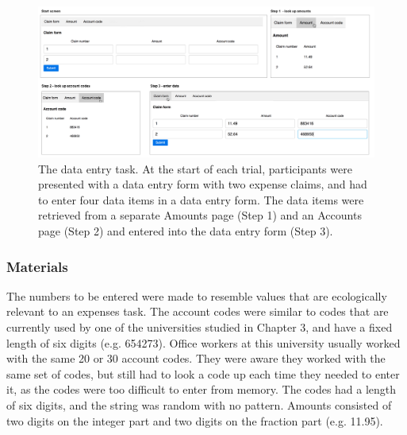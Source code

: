 \begin{figure}
 \includegraphics[width=\textwidth]{images/ch34/ch34-4_Tasksequence.pdf}
    \caption{The data entry task. At the start of each trial, participants were presented with a data entry form with two expense claims, and had to enter four data items in a data entry form. The data items were retrieved from a separate Amounts page (Step 1) and an Accounts page (Step 2) and entered into the data entry form (Step 3).}\label{fig:ch34_4-tasklayout}
\end{figure}

\subsubsection{Materials}
The numbers to be entered were made to resemble values that are ecologically relevant to an expenses task. The account codes were similar to codes that are currently used by one of the universities studied in Chapter 3, and have a fixed length of six digits (e.g. 654273). Office workers at this university usually worked with the same 20 or 30 account codes. They were aware they worked with the same set of codes, but still had to look a code up each time they needed to enter it, as the codes were too difficult to enter from memory. The codes had a length of six digits, and the string was random with no pattern. Amounts consisted of two digits on the integer part and two digits on the fraction part (e.g. 11.95). 


